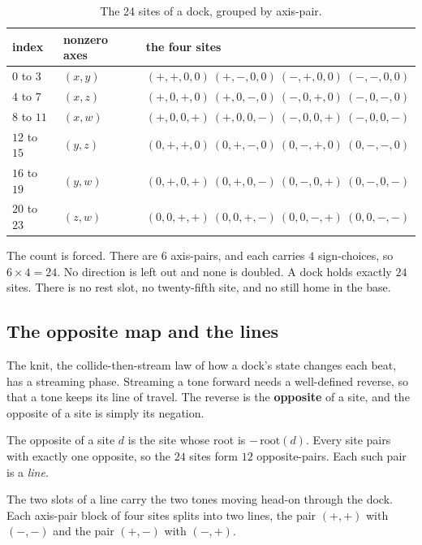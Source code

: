 \begin{table}[ht]
\centering
\begin{tabular}{@{}lll@{}}
\toprule
index & nonzero axes & the four sites \\
\midrule
$0$ to $3$ & $(x, y)$ & $(+,+,0,0)\ (+,-,0,0)\ (-,+,0,0)\ (-,-,0,0)$ \\
$4$ to $7$ & $(x, z)$ & $(+,0,+,0)\ (+,0,-,0)\ (-,0,+,0)\ (-,0,-,0)$ \\
$8$ to $11$ & $(x, w)$ & $(+,0,0,+)\ (+,0,0,-)\ (-,0,0,+)\ (-,0,0,-)$ \\
$12$ to $15$ & $(y, z)$ & $(0,+,+,0)\ (0,+,-,0)\ (0,-,+,0)\ (0,-,-,0)$ \\
$16$ to $19$ & $(y, w)$ & $(0,+,0,+)\ (0,+,0,-)\ (0,-,0,+)\ (0,-,0,-)$ \\
$20$ to $23$ & $(z, w)$ & $(0,0,+,+)\ (0,0,+,-)\ (0,0,-,+)\ (0,0,-,-)$ \\
\bottomrule
\end{tabular}
\caption{The 24 sites of a dock, grouped by axis-pair.}
\label{tab:24-directions}
\end{table}

The count is forced. There are $6$ axis-pairs, and each carries $4$ sign-choices, so $6 \times 4 = 24$. No direction is left out and none is doubled. A dock holds exactly $24$ sites. There is no rest slot, no twenty-fifth site, and no still home in the base.

\subsection{The opposite map and the lines}

The knit, the collide-then-stream law of how a dock's state changes each beat, has a streaming phase. Streaming a tone forward needs a well-defined reverse, so that a tone keeps its line of travel. The reverse is the \textbf{opposite} of a site, and the opposite of a site is simply its negation.

\begin{definition}
The opposite of a site $d$ is the site whose root is $-\,\mathrm{root}(d)$. Every site pairs with exactly one opposite, so the $24$ sites form $12$ opposite-pairs. Each such pair is a \emph{line}.
\end{definition}

The two slots of a line carry the two tones moving head-on through the dock. Each axis-pair block of four sites splits into two lines, the pair $(+,+)$ with $(-,-)$ and the pair $(+,-)$ with $(-,+)$.

